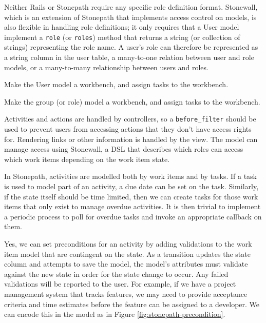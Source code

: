 \documentclass[document.tex]{subfiles}
\begin{document}

Neither Rails or Stonepath require any specific role definition format. Stonewall, which is an extension of Stonepath that implements access control on models, is also flexible in handling role definitions; it only requires that a User model implement a \verb!role! (or \verb!roles!) method that returns a string (or collection of strings) representing the role name. A user's role can therefore be represented as a string column in the user table, a many-to-one relation between user and role models, or a many-to-many relationship between users and roles.


Make the User model a workbench, and assign tasks to the workbench.


Make the group (or role) model a workbench, and assign tasks to the workbench.


Activities and actions are handled by controllers, so a \verb!before_filter! should be used to prevent users from accessing actions that they don't have access rights for. Rendering links or other information is handled by the view. The model can manage access using Stonewall, a DSL that describes which roles can access which work items depending on the work item state.


In Stonepath, activities are modelled both by work items and by tasks. If a task is used to model part of an activity, a due date can be set on the task. Similarly, if the state itself should be time limited, then we can create tasks for those work items that only exist to manage overdue activities. It is then trivial to implement a periodic process to poll for overdue tasks and invoke an appropriate callback on them.


Yes, we can set preconditions for an activity by adding validations to the work item model that are contingent on the state. As a transition updates the state column and attempts to save the model, the model's attributes must validate against the new state in order for the state change to occur. Any failed validations will be reported to the user. For example, if we have a project management system that tracks features, we may need to provide acceptance criteria and time estimates before the feature can be assigned to a developer.
We can encode this in the model as in Figure \ref{fig:stonepath-precondition}.
\end{document}
